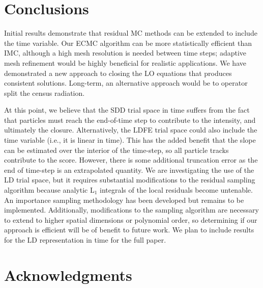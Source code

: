 \documentclass{anstrans}
\begin{document}
\section{Conclusions}

Initial results demonstrate that residual MC methods can be extended to include the time
variable.  Our ECMC algorithm can be more statistically efficient than IMC, although a
high mesh resolution is needed between time steps; adaptive mesh refinement would be
highly beneficial for realistic applications.  We have demonstrated a new approach to
closing the LO equations that produces consistent solutions.  Long-term, an alternative approach would be
to operator split the census radiation.

At this point, we believe that the SDD trial space in time suffers from the fact that particles must
reach the end-of-time step to contribute to the intensity, and ultimately the closure.  Alternatively, the LDFE trial space
could also include the time variable (i.e., it is linear in time).  This has the added
benefit that the slope can be estimated over the interior of the time-step, so all
particle tracks contribute to the score.  However, there is some additional truncation
error as the end of time-step is an extrapolated quantity.  We are investigating the use
of the LD trial space, but it requires substantial modifications to the residual sampling
algorithm because analytic L$_1$ integrals of the local residuals become untenable.  An
importance sampling methodology has been developed but remains to be implemented.  Additionally, modifications to the sampling
algorithm are necessary to extend to higher spatial dimensions or polynomial order, so determining if our
approach is efficient will be of benefit to future work. We plan to include results
for the LD representation in time for the full paper. 

\section{Acknowledgments}





\end{document}
